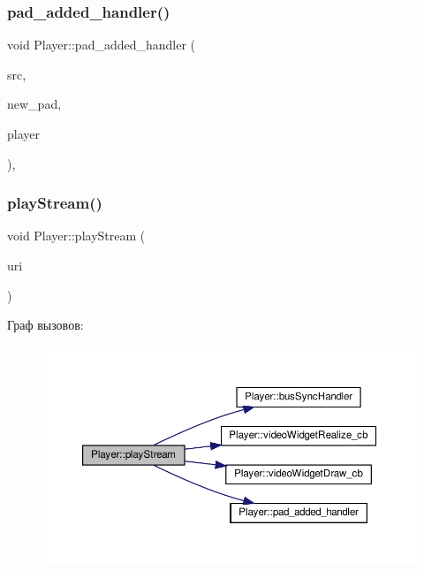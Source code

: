 \mbox{\label{class_player_a43527d455f9de17468deb13fef887854}} 
\subsubsection{\texorpdfstring{pad\+\_\+added\+\_\+handler()}{pad\_added\_handler()}\hspace{0.1cm}{\footnotesize\ttfamily [2/2]}}
{\footnotesize\ttfamily void Player\+::pad\+\_\+added\+\_\+handler (\begin{DoxyParamCaption}\item[{Gst\+Element $\ast$}]{src,  }\item[{Gst\+Pad $\ast$}]{new\+\_\+pad,  }\item[{\hyperlink{class_player}{Player} $\ast$}]{player }\end{DoxyParamCaption})\hspace{0.3cm}{\ttfamily [static]}, {\ttfamily [private]}}

\mbox{\label{class_player_a75c7257813c5f96bb2d8585dfc0c3025}} 
\subsubsection{\texorpdfstring{play\+Stream()}{playStream()}\hspace{0.1cm}{\footnotesize\ttfamily [1/2]}}
{\footnotesize\ttfamily void Player\+::play\+Stream (\begin{DoxyParamCaption}\item[{string}]{uri }\end{DoxyParamCaption})}

Граф вызовов\+:\nopagebreak
\begin{figure}[H]
\begin{center}
\leavevmode
\includegraphics[width=350pt]{class_player_a75c7257813c5f96bb2d8585dfc0c3025_cgraph}
\end{center}
\end{figure}
\mbox{\label{class_player_a082180138fe92098aa9a1f51fd9ad40d}} 

